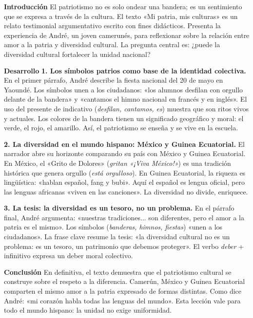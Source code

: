 \documentclass[11pt]{article}
\newcounter{popsec}
\newcounter{popsub}
\newcommand{\courssub}[1]{%
  \stepcounter{popsub}%
  \par\vspace{9pt}\noindent{\popxbold\fontsize{11.5}{13}\selectfont\color{popink}{\color{poporange}\thepopsec.\thepopsub}\hspace{6pt}#1}\par\nopagebreak\vspace{4pt}
}
\begin{document}
\courssub{Commentaire modèle : « Mi patria, mis culturas »}

\begin{textebox}
\textbf{Introducción}
El patriotismo no es solo ondear una bandera; es un sentimiento que se expresa a través de la cultura. El texto «Mi patria, mis culturas» es un relato testimonial argumentativo escrito con fines didácticos. Presenta la experiencia de André, un joven camerunés, para reflexionar sobre la relación entre amor a la patria y diversidad cultural. La pregunta central es: ¿puede la diversidad cultural fortalecer la unidad nacional?

\textbf{Desarrollo}
\textbf{1. Los símbolos patrios como base de la identidad colectiva.}
En el primer párrafo, André describe la fiesta nacional del 20 de mayo en Yaoundé. Los símbolos unen a los ciudadanos: «los alumnos desfilan con orgullo delante de la bandera» y «cantamos el himno nacional en francés y en inglés». El uso del presente de indicativo (\textit{desfilan, cantamos, es}) muestra que son ritos vivos y actuales. Los colores de la bandera tienen un significado geográfico y moral: el verde, el rojo, el amarillo. Así, el patriotismo se enseña y se vive en la escuela.

\textbf{2. La diversidad en el mundo hispano: México y Guinea Ecuatorial.}
El narrador abre su horizonte comparando su país con México y Guinea Ecuatorial. En México, el «Grito de Dolores» (\textit{gritan «¡Viva México!»}) es una tradición histórica que genera orgullo (\textit{está orgulloso}). En Guinea Ecuatorial, la riqueza es lingüística: «hablan español, fang y bubi». Aquí el español es lengua oficial, pero las lenguas africanas «viven en las canciones». La diversidad no divide, enriquece.

\textbf{3. La tesis: la diversidad es un tesoro, no un problema.}
En el párrafo final, André argumenta: «nuestras tradiciones... son diferentes, pero el amor a la patria es el mismo». Los símbolos (\textit{banderas, himnos, fiestas}) «unen a los ciudadanos». La frase clave resume la tesis: «la diversidad cultural no es un problema: es un tesoro, un patrimonio que debemos proteger». El verbo \textit{deber} + infinitivo expresa un deber moral colectivo.

\textbf{Conclusión}
En definitiva, el texto demuestra que el patriotismo cultural se construye sobre el respeto a la diferencia. Camerún, México y Guinea Ecuatorial comparten el mismo amor a la patria expresado de formas distintas. Como dice André: «mi corazón habla todas las lenguas del mundo». Esta lección vale para todo el mundo hispano: la unidad no exige uniformidad.
\end{textebox}
\end{document}
